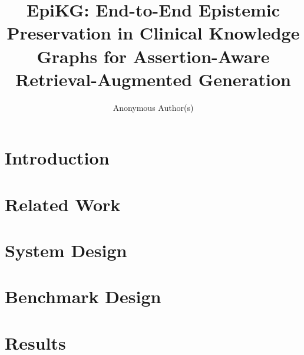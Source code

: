 \documentclass[10pt]{article}
\title{EpiKG: End-to-End Epistemic Preservation in Clinical Knowledge Graphs for Assertion-Aware Retrieval-Augmented Generation}
\author{
  Anonymous Author(s)
}
\begin{document}
\maketitle

\begin{abstract}

\end{abstract}

\section{Introduction}
\label{sec:intro}


\section{Related Work}
\label{sec:related}


\section{System Design}
\label{sec:system}


\section{Benchmark Design}
\label{sec:benchmarks}


\section{Results}
\label{sec:results}

\end{document}

